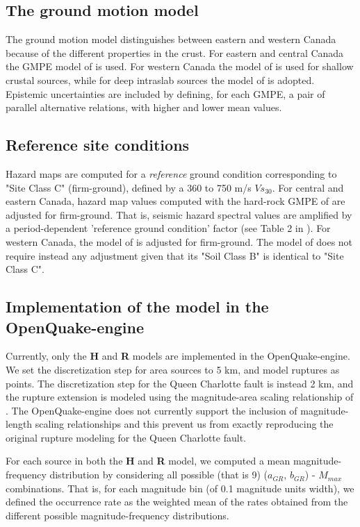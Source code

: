 \subsection{The ground motion model}
The ground motion model distinguishes between eastern and western Canada because
of the different properties in the crust. For eastern and central Canada the
GMPE model of \citet{ab1995} is used. For western Canada the model of
\citet{bjf1993} is used for shallow crustal sources, while for deep intraslab
sources the model of \citet{y1997} is adopted. Epistemic uncertainties are
included by defining, for each GMPE, a pair of parallel alternative relations,
with higher and lower mean values.
%
\subsection{Reference site conditions}
Hazard maps are computed for a \textit{reference} ground condition corresponding
to "Site Class C" (firm-ground), defined by a 360 to 750 m/s $Vs_{30}$. For
central and eastern Canada, hazard map values computed with the hard-rock GMPE
of \citet{ab1995} are adjusted for firm-ground. That is, seismic hazard spectral
values are amplified by a period-dependent 'reference ground condition' factor
(see Table 2 in \cite{adams2003}). For western Canada, the model of
\citet{y1997} is adjusted for firm-ground. The model of \citet{bjf1993} does not
require instead any adjustment given that its "Soil Class B" is identical to
"Site Class C".
%
\subsection{Implementation of the model in the OpenQuake-engine}
Currently, only the \textbf{H} and \textbf{R} models are implemented in the
OpenQuake-engine. We set the discretization step for area sources to 5 km, and
model ruptures as points. The discretization step for the Queen Charlotte fault
is instead 2 km, and the rupture extension is modeled using the magnitude-area
scaling relationship of \citet{wells1994}. The OpenQuake-engine does not
currently support the inclusion of magnitude-length scaling relationships and
this prevent us from exactly reproducing the original rupture modeling for the
Queen Charlotte fault.

For each source in both the \textbf{H} and \textbf{R} model, we computed a mean
magnitude-frequency distribution by considering all possible (that is 9)
($a_{GR}$, $b_{GR}$) - $M_{max}$ combinations. That is, for each magnitude bin
(of 0.1 magnitude units width), we defined the occurrence rate as the weighted
mean of the rates obtained from the different possible magnitude-frequency
distributions.

